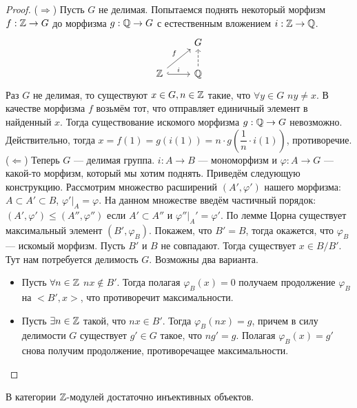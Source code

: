 \documentclass[../main.tex]{subfiles}
\begin{document}
\begin{proof}
($\Rightarrow$) Пусть $G$ не делимая. Попытаемся поднять некоторый морфизм $f:\mathbb{Z}\to G$ до морфизма $g:\mathbb{Q} \to G$ с естественным вложением $i:\mathbb{Z} \to \mathbb{Q}$.
\begin{equation*}
\begin{tikzcd}
	& G \\
	\Z & \Q
	\arrow["i", hook, from=2-1, to=2-2]
	\arrow["f", from=2-1, to=1-2]
	\arrow[dashed, from=2-2, to=1-2]
\end{tikzcd}
\end{equation*}
Раз $G$ не делимая, то существуют $x \in G, n \in \mathbb{Z}$ такие, что $\forall y \in G$ $ny \ne x$. В качестве морфизма $f$ возьмём тот, что отправляет единичный элемент в найденный $x$. Тогда существование искомого морфизма $g:\mathbb{Q} \to G$ невозможно. Действительно, тогда $x = f(1) = g(i(1)) =n\cdot g(\dfrac{1}{n}\cdot i(1)) $, противоречие.
($\Leftarrow$)
Теперь $G$ --- делимая группа. $i : A \to B$ --- мономорфизм и $\varphi: A\to G$ --- какой-то морфизм, который мы хотим поднять. Приведём следующую конструкцию. Рассмотрим множество расширений $(A', \varphi')$ нашего морфизма: $A \subset A' \subset B$, $\varphi'|_A = \varphi$. На данном множестве введём частичный порядок: $(A', \varphi') \le (A'', \varphi'')$ если $A'\subset A''$ и $\varphi''|_A' = \varphi'$. По лемме Цорна существует максимальный элемент $(B', \varphi_B)$. Покажем, что $B'=B$, тогда окажется, что $\varphi_B$ --- искомый морфизм.
Пусть $B'$ и $B$ не совпадают. Тогда существует $x\in B/B'$. Тут нам потребуется делимость $G$. Возможны два варианта.
\begin{itemize}
    \item Пусть $\forall n\in\mathbb{Z}$ $nx \notin B'$. Тогда полагая $\varphi_B(x) = 0$ получаем продолжение $\varphi_B$ на $<B', x>$, что противоречит максимальности.
    \item Пусть $\exists n\in \mathbb{Z}$ такой, что $nx\in B'$. Тогда $\varphi_B(nx) = g$, причем в силу делимости $G$ существует $g'\in G$ такое, что $ng' = g$. Полагая $\varphi_B(x) = g'$ снова получим продолжение, противоречащее максимальности.
\end{itemize}
\end{proof}
\begin{to_suj}
В категории $\mathbb{Z}$-модулей достаточно инъективных объектов.
\end{to_suj}
\end{document}
